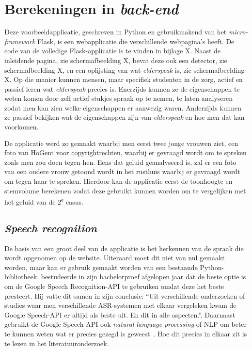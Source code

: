 \section{Berekeningen in \textit{back-end}}
Deze voorbeeldapplicatie, geschreven in Python en gebruikmakend van het \textit{micro-framework} Flask, is een webapplicatie die verschillende webpagina’s heeft. De code van de volledige Flask-applicatie is te vinden in bijlage X. Naast de inleidende pagina, zie schermafbeelding X, bevat deze ook een detector, zie schermafbeelding X, en een oplijsting van wat \textit{elderspeak} is, zie schermafbeelding X. Op die manier kunnen mensen, maar specifiek studenten in de zorg, actief en passief leren wat \textit{elderspeak} precies is. Enerzijds kunnen ze de eigenschappen te weten komen door zelf actief stukjes spraak op te nemen, te laten analyseren zodat men kan zien welke eigenschappen er aanwezig waren. Anderzijds kunnen ze passief bekijken wat de eigenschappen zijn van \textit{elderspeak} en hoe men dat kan voorkomen.

De applicatie werd zo gemaakt waarbij men eerst twee jonge vrouwen ziet, een foto van HoGent voor copyrightrechten, waarbij er gevraagd wordt om te spreken zoals men zou doen tegen hen. Eens dat geluid geanalyseerd is, zal er een foto van een oudere vrouw getoond wordt in het rusthuis waarbij er gevraagd wordt om tegen haar te spreken. Hierdoor kan de applicatie eerst de toonhoogte en stemvolume berekenen zodat deze gebruikt kunnen worden om te vergelijken met het geluid van de 2\textsuperscript{e} casus.

\subsection{\textit{Speech recognition}}
De basis van een groot deel van de applicatie is het herkennen van de spraak die wordt opgenomen op de website. Uiteraard moet dit niet van nul gemaakt worden, maar kan er gebruik gemaakt worden van een bestaande Python-bibliotheek. \textcite{Standaert2021} bestudeerde in zijn bachelorproef afgelopen jaar dat de beste optie is om de Google Speech Recognition-API te gebruiken omdat deze het beste presteert. Hij vatte dit samen in zijn conclusie: ``Uit verschillende onderzoeken of studies waar men verschillende ASR-systemen met elkaar vergeleken kwam de Google Speech-API er altijd als beste uit. En dit in alle aspecten.''. Daarnaast gebruikt de Google Speech-API ook \textit{natural language processing} of NLP om beter te kunnen weten wat er precies gezegd is geweest~\autocite{GoogleCloud2022}. Hoe dit precies in elkaar zit is te lezen in het literatuuronderzoek.

